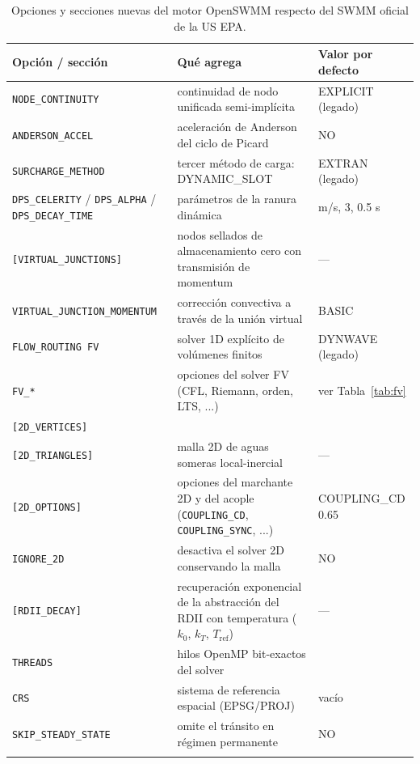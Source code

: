 \documentclass[11pt,a4paper]{article}
\begin{document}
\begin{longtable}{>{\raggedright}p{5.4cm}>{\raggedright}p{5.0cm}>{\raggedright\arraybackslash}p{3.8cm}}
\toprule
\textbf{Opción / sección} & \textbf{Qué agrega} & \textbf{Valor por defecto} \\
\midrule
\endhead
\texttt{NODE\_CONTINUITY} & continuidad de nodo unificada semi-implícita &
  EXPLICIT (legado) \\
\texttt{ANDERSON\_ACCEL} & aceleración de Anderson del ciclo de Picard & NO \\
\texttt{SURCHARGE\_METHOD} & tercer método de carga: DYNAMIC\_SLOT &
  EXTRAN (legado) \\
\texttt{DPS\_CELERITY} / \texttt{DPS\_ALPHA} / \texttt{DPS\_DECAY\_TIME} &
  parámetros de la ranura dinámica & 25 m/s, 3, 0.5 s \\
\texttt{[VIRTUAL\_JUNCTIONS]} & nodos sellados de almacenamiento cero con
  transmisión de momentum & --- \\
\texttt{VIRTUAL\_JUNCTION\_MOMENTUM} & corrección convectiva a través de la
  unión virtual & BASIC \\
\texttt{FLOW\_ROUTING FV} & solver 1D explícito de volúmenes finitos &
  DYNWAVE (legado) \\
\texttt{FV\_*} & opciones del solver FV (CFL, Riemann, orden, LTS, ...) &
  ver Tabla~\ref{tab:fv} \\
\texttt{[2D\_VERTICES]} \\[-2pt] \texttt{[2D\_TRIANGLES]} & malla 2D de aguas
  someras local-inercial & --- \\
\texttt{[2D\_OPTIONS]} & opciones del marchante 2D y del acople
  (\texttt{COUPLING\_CD}, \texttt{COUPLING\_SYNC}, ...) & COUPLING\_CD 0.65 \\
\texttt{IGNORE\_2D} & desactiva el solver 2D conservando la malla & NO \\
\texttt{[RDII\_DECAY]} & recuperación exponencial de la abstracción del RDII
  con temperatura ($k_0$, $k_T$, $T_{\mathrm{ref}}$) & --- \\
\texttt{THREADS} & hilos OpenMP bit-exactos del solver & 1 \\
\texttt{CRS} & sistema de referencia espacial (EPSG/PROJ) & vacío \\
\texttt{SKIP\_STEADY\_STATE} & omite el tránsito en régimen permanente & NO \\
\bottomrule
\caption{Opciones y secciones nuevas del motor OpenSWMM respecto del SWMM
oficial de la US EPA.}
\label{tab:nuevas}
\end{longtable}
\end{document}
